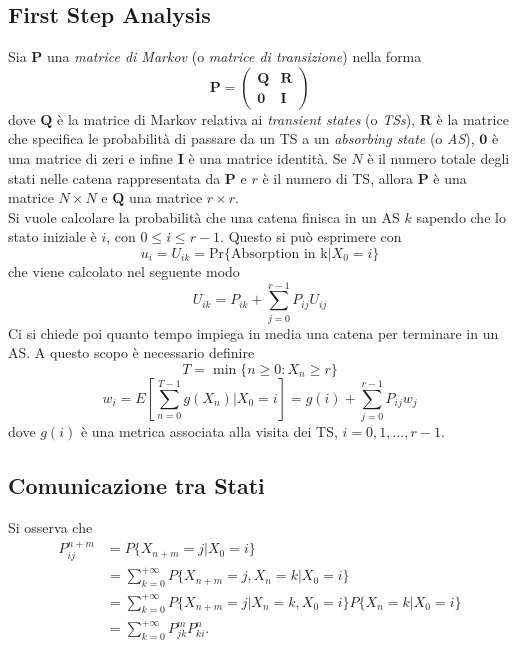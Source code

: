 \documentclass{article}
\begin{document}
\subsection{First Step Analysis}
Sia $\mathbf{P}$ una \textit{matrice di Markov} (o \textit{matrice di transizione}) nella forma
\[
    \mathbf{P} = \left( \begin{array}{cc}
    \mathbf{Q} & \mathbf{R} \\
    \mathbf{0} & \mathbf{I} \end{array} \right)
\]
dove $\mathbf{Q}$ è la matrice di Markov relativa ai \textit{transient states} (o \textit{TSs}), $\mathbf{R}$ è la matrice che specifica le probabilità di passare da un TS a un \textit{absorbing state} (o \textit{AS}), $\mathbf{0}$ è una matrice di zeri e infine $\mathbf{I}$ è una matrice identità. Se $N$ è il numero totale degli stati nelle catena rappresentata da $\mathbf{P}$ e $r$ è il numero di TS, allora $\mathbf{P}$ è una matrice $N \times N$ e $\mathbf{Q}$ una matrice $r \times r$.\\
Si vuole calcolare la probabilità che una catena finisca in un AS $k$ sapendo che lo stato iniziale è $i$, con $0 \le i \le r-1$. Questo si può esprimere con
\begin{equation}
    u_i = U_{ik} = \text{Pr}\{\text{Absorption in k} | X_0 = i\}
\end{equation}
che viene calcolato nel seguente modo
\begin{equation}
    U_{ik} = P_{ik} +  \sum_{j=0}^{r-1}P_{ij}U_{ij}
\end{equation}
Ci si chiede poi quanto tempo impiega in media una catena per terminare in un AS. A questo scopo è necessario definire
\begin{equation}
    T = \min\{n \ge 0 : X_n \ge r\}
\end{equation}
\begin{equation}
    w_i = E[\sum_{n=0}^{T-1}g(X_n) | X_0 = i] = g(i) +\sum_{j=0}^{r-1}P_{ij}w_j
\end{equation}
dove $g(i)$ è una metrica associata alla visita dei TS, $i = 0,1,...,r-1$.

\subsection{Comunicazione tra Stati}
Si osserva che
\begin{align*}
    P_{ij}^{n+m} & = P\{X_{n+m} = j | X_0 = i\} 
    \\&= \sum_{k=0}^{+\infty} P\{X_{n+m} = j, X_n = k | X_0 = i\} 
    \\&= \sum_{k=0}^{+\infty} P\{X_{n+m} = j | X_n = k, X_0 = i\} P\{X_n = k | X_0 = i\} 
    \\&= \sum_{k=0}^{+\infty} P_{jk}^m P_{ki}^n. 
\end{align*} 
\end{document}
